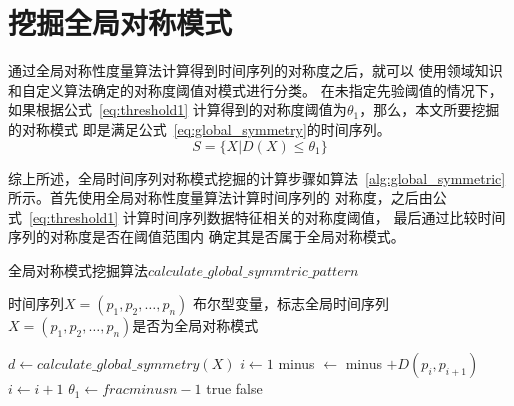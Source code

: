 \section{挖掘全局对称模式}
通过全局对称性度量算法计算得到时间序列的对称度之后，就可以
使用领域知识和自定义算法确定的对称度阈值对模式进行分类。
在未指定先验阈值的情况下，如果根据公式~\ref{eq:threshold1}
计算得到的对称度阈值为$\theta_1$，那么，本文所要挖掘的对称模式
即是满足公式~\ref{eq:global_symmetry}的时间序列。
\begin{equation}
  S = \{X|D(X)\leq\theta_1\}
  \label{eq:global_symmetry}
\end{equation}

综上所述，全局时间序列对称模式挖掘的计算步骤如算法~\ref{alg:global_symmetric}
所示。首先使用全局对称性度量算法计算时间序列的
对称度，之后由公式~\ref{eq:threshold1}
计算时间序列数据特征相关的对称度阈值，
最后通过比较时间序列的对称度是否在阈值范围内
确定其是否属于全局对称模式。

\renewcommand{\algorithmicrequire}{\textbf{输入：}\unskip}
\renewcommand{\algorithmicensure}{\textbf{输出：}\unskip}
\begin{algorithm}
  \caption{全局对称模式挖掘算法$calculate\_global\_symmtric\_pattern$}
  \label{alg:global_symmetric}
  \small
  \begin{algorithmic}
    \REQUIRE 时间序列$X=\left(p_{1}, p_{2}, \dots, p_{n}\right)$
    \ENSURE 布尔型变量，标志全局时间序列$X=\left(p_{1},p_{2},\dots,p_n \right)$是否为全局对称模式

    \STATE $d \leftarrow calculate\_global\_symmetry(X) $
    \STATE $i \leftarrow 1$
    \STATE minus $\leftarrow$ minus $+D\left(p_{i}, p_{i+1}\right)$
    \STATE $i \leftarrow i+1$
    \ENDWHILE
    \STATE $\theta_1 \leftarrow frac{minus}{n-1}$
      \RETURN true
    \ELSE
      \RETURN false
    \ENDIF
  \end{algorithmic}
\end{algorithm}



